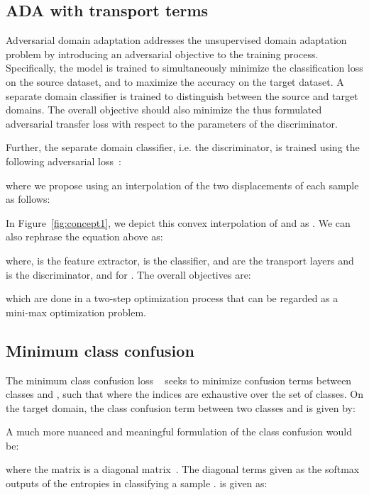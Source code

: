 \documentclass[10pt,twocolumn,letterpaper]{article}
\begin{document}
\subsection{ADA with transport terms}
\label{sec:add}

Adversarial domain adaptation addresses the unsupervised domain adaptation problem by introducing an adversarial objective to the training process. Specifically, the model is trained to simultaneously minimize the classification loss on the source dataset, and to maximize the accuracy on the target dataset. A separate domain classifier is trained to distinguish between the source and target domains. The overall objective should also minimize the thus formulated adversarial transfer loss with respect to the parameters of the discriminator.

Further, the separate domain classifier, i.e. the discriminator, is trained using the following adversarial loss~\cite{cdan,dann}:

where we propose using an interpolation of the two displacements of each sample as follows: 

In Figure~\ref{fig:concept1}, we depict this convex interpolation of  and  as . We can also rephrase the equation above as:

where,  is the feature extractor,  is the classifier,  and  are the transport layers and  is the discriminator, and  for  . The overall objectives are:
 
 
which are done in a two-step optimization process that can be regarded as a mini-max optimization problem.


\subsection{Minimum class confusion}

The minimum class confusion loss ~\cite{mcc} seeks to minimize confusion terms between classes  and , such that  where the indices are exhaustive over the set of classes. On the target domain, the class confusion term between two classes  and  is given by:  \begin{center}
      
 \end{center} 
 
A much more nuanced and meaningful formulation of the class confusion would be:

 
where the matrix  is a diagonal matrix~\cite{mcc}. The diagonal terms  given as the softmax outputs of the entropies in classifying a sample .  is given as: 
  
\end{document}
